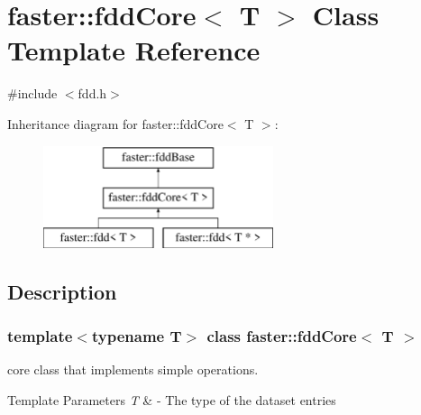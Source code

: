 \hypertarget{classfaster_1_1fddCore}{}\section{faster\+:\+:fdd\+Core$<$ T $>$ Class Template Reference}
\label{classfaster_1_1fddCore}


{\ttfamily \#include $<$fdd.\+h$>$}

Inheritance diagram for faster\+:\+:fdd\+Core$<$ T $>$\+:\begin{figure}[H]
\begin{center}
\leavevmode
\includegraphics[height=3.000000cm]{classfaster_1_1fddCore}
\end{center}
\end{figure}


\subsection{Description}
\subsubsection*{template$<$typename T$>$\newline
class faster\+::fdd\+Core$<$ T $>$}

core class that implements simple operations. 


\begin{DoxyTemplParams}{Template Parameters}
{\em T} & -\/ The type of the dataset entries \\
\hline
\end{DoxyTemplParams}
